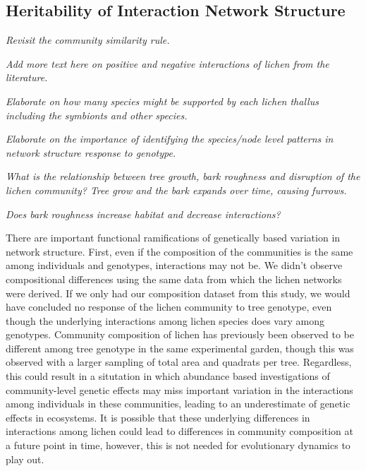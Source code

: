 \documentclass[11pt,twocolumn,twoside,lineno]{pnas-new}
\begin{document}
\subsection*{Heritability of Interaction Network Structure}

\textit{Revisit the community similarity rule.}


\textit{Add more text here on positive and negative interactions of
  lichen from the literature.} 


\textit{Elaborate on how many species might be supported by each
  lichen thallus including the symbionts and other species.}


\textit{Elaborate on the importance of identifying the species/node
  level patterns in network structure response to genotype.}


\textit{What is the relationship between tree growth, bark roughness
  and disruption of the lichen community? Tree grow and the bark
  expands over time, causing furrows. }

\textit{Does bark roughness increase habitat and decrease interactions?}

There are important functional ramifications of genetically based
variation in network structure. First, even if the composition of the
communities is the same among individuals and genotypes, interactions
may not be. We didn't observe compositional differences using the same
data from which the lichen networks were derived. If we only had our
composition dataset from this study, we would have concluded no
response of the lichen community to tree genotype, even though the
underlying interactions among lichen species does vary among
genotypes. Community composition of lichen has previously been
observed to be different among tree genotype in the same experimental
garden, though this was observed with a larger sampling of total area
and quadrats per tree. Regardless, this could result in a situtation
in which abundance based investigations of community-level genetic
effects may miss important variation in the interactions among
individuals in these communities, leading to an underestimate of
genetic effects in ecosystems. It is possible that these underlying
differences in interactions among lichen could lead to differences in
community composition at a future point in time, however, this is not
needed for evolutionary dynamics to play out.
\end{document}
